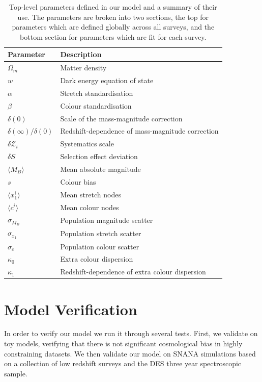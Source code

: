 \documentclass[a4paper,fleqn,usenatbib]{mnras}
\newcommand{\green}{\color{forestgreen}}
\begin{document}
\begin{table}
	\centering
	\caption{{\green Top-level parameters defined in our model and a summary of their use. The parameters are broken into two sections, the top for parameters which are defined globally across all surveys, and the bottom section for parameters which are fit for each survey.}}
	\label{tab:param_summary}
	\begin{tabular}{ll}
		\hline
		Parameter & Description \\
		\hline
		$\Omega_m$  & Matter density  \\
		$w$  &  Dark energy equation of state  \\
		$\alpha$ & Stretch standardisation   \\
		$\beta$         &  Colour standardisation   \\
		$\delta(0)$ & Scale of the mass-magnitude correction\\
		$\delta(\infty)/\delta(0)$ & Redshift-dependence of mass-magnitude correction\\
		$\delta\mathcal{Z}_i$ & Systematics scale\\
		$\delta S$ & Selection effect deviation \\
		$\langle M_B \rangle$ & Mean absolute magnitude \\
		$s$ & Colour bias\\
		\hline
		$\langle x_1^i \rangle$ & Mean stretch nodes\\
		$\langle c^i \rangle$ & Mean colour nodes\\
		$\sigma_{M_B}$ & Population magnitude scatter \\
		$\sigma_{x_1}$ & Population stretch scatter \\
		$\sigma_{c}$ & Population colour scatter \\
		$\kappa_{0}$ & Extra colour dispersion\\
		$\kappa_{1}$ & Redshift-dependence of extra colour dispersion\\
		\hline
	\end{tabular}
\end{table}





\section{Model Verification}
\label{sec:verification}

In order to verify our model we run it through several tests. First, we validate on toy models, verifying that there is not significant cosmological bias in highly constraining datasets. We then validate our model on SNANA simulations based on a collection of low redshift surveys and the DES three year spectroscopic sample.
\end{document}
